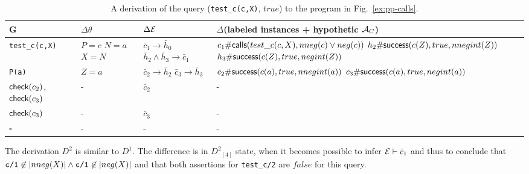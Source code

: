 \documentclass{llncs}
\newcommand{\AC}
  {\ensuremath{{\cal A}_{C}}}
\newcommand{\kbd}[1]{\mbox{\tt #1}}
\newcommand{\emptyGoal}{\ensuremath{\square}}
\newcommand{\ADeps}{\ensuremath{{\cal E}}}
\newcommand{\nthstate}[2]{\ensuremath{{#1}_{[#2]}}}
\newcommand{\asrId}[1]{\ensuremath{c_{#1}}}
\newcommand{\negAsrId}[1]{\ensuremath{\bar{c}_{#1}}}
\newcommand{\hypId}[1]{\ensuremath{h_{#1}}}
\newcommand{\negHypId}[1]{\ensuremath{\bar{h}_{#1}}}
\newcommand{\checkLitLab}[1]{\ensuremath{\textsf{check}(#1)}}
\newcommand{\labCallsAsr}[3]
  {\ensuremath{\textsf{\asrId{#1}\#calls}(#2, #3)}}
\newcommand{\labSuccessAsr}[4]
  {\ensuremath{\textsf{\asrId{#1}\#success}(#2, #3, #4)}}
\newcommand{\hypSuccessAsr}[4]
  {\ensuremath{\textsf{\hypId{#1}\#success}(#2, #3, #4)}}
\begin{document}
\begin{table}[h]
  \caption{A derivation of the query (\kbd{test\_c(c,X)}, $true$) to
    the program in Fig.~\ref{ex:pp-calls}.}
  \begin{minipage}{\textwidth}
    \small
    \begin{tabular}{p{}|p{}p{}p{}}
      \hline
      G         
          & $\Delta\theta$  
          & $\Delta\ADeps$ 
          & $\Delta$(labeled instances + hypothetic $\AC$)
      \\ \hline
      {\tt test\_c(c,X)}     
          & $P = c$\newline
            $N = a$\newline
            $X = N$    
          & $\negAsrId{1} \rightarrow \negHypId{0}$\newline
            $\negHypId{2} \wedge \negHypId{3}
             \rightarrow \negAsrId{1}$
          & $\labCallsAsr{1}{test\_c(c,X)}{nneg(c) \vee neg(c)}$\newline
            $\hypSuccessAsr{2}{c(Z)}{true}{nnegint(Z)}$\newline
            $\hypSuccessAsr{3}{c(Z)}{true}{negint(Z)}$
      \\ \hline
      {\tt P(a)} 
          & $Z = a$         
          & $\negAsrId{2} \rightarrow \negHypId{2}$\newline
            $\negAsrId{3} \rightarrow \negHypId{3}$
          & $\labSuccessAsr{2}{c(a)}{true}{nnegint(a)}$\newline
            $\labSuccessAsr{3}{c(a)}{true}{negint(a)}$ 
      \\ \hline
      \checkLitLab{$\asrId{2}$},\newline
      \checkLitLab{$\asrId{3}$}        
          & -       
          & $\negAsrId{2}$
          & -
      \\ \hline
      \checkLitLab{$\asrId{3}$} 
          & -          
          & $\negAsrId{3}$
          & -
      \\ \hline 
      \emptyGoal
         & -
         & -
         & -
      \\ \hline
    \end{tabular}
  \end{minipage}
  \label{tbl:test2}  
\end{table}

The derivation $D^2$ is similar to $D^1$. The difference is in
$\nthstate{D^2}{4}$ state, when it becomes possible to infer $\ADeps
\vdash \negAsrId{1}$ and thus to conclude that $\kbd{c/1} \not\in
|nneg(X)| \wedge \kbd{c/1} \not\in |neg(X)|$ and that both assertions
for \kbd{test\_c/2} are $false$ for this query.
\end{document}
